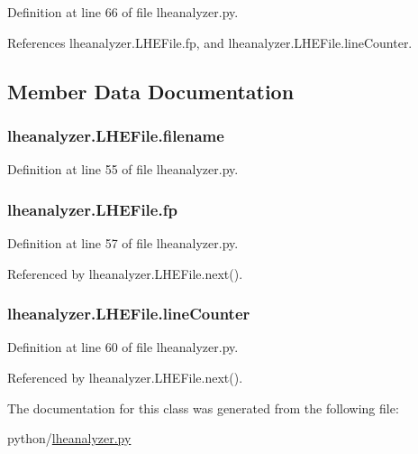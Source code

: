 Definition at line 66 of file lheanalyzer.\-py.



References lheanalyzer.\-L\-H\-E\-File.\-fp, and lheanalyzer.\-L\-H\-E\-File.\-line\-Counter.



\subsection{Member Data Documentation}
\subsubsection[{filename}]{\setlength{\rightskip}{0pt plus 5cm}lheanalyzer.\-L\-H\-E\-File.\-filename}\label{classlheanalyzer_1_1LHEFile_a4540497f01574a404af5e6c88b778444}


Definition at line 55 of file lheanalyzer.\-py.

\subsubsection[{fp}]{\setlength{\rightskip}{0pt plus 5cm}lheanalyzer.\-L\-H\-E\-File.\-fp}\label{classlheanalyzer_1_1LHEFile_a925cda8d013b284001623d05f895f364}


Definition at line 57 of file lheanalyzer.\-py.



Referenced by lheanalyzer.\-L\-H\-E\-File.\-next().

\subsubsection[{line\-Counter}]{\setlength{\rightskip}{0pt plus 5cm}lheanalyzer.\-L\-H\-E\-File.\-line\-Counter}\label{classlheanalyzer_1_1LHEFile_a829825c01eef6f78b107240b56730aad}


Definition at line 60 of file lheanalyzer.\-py.



Referenced by lheanalyzer.\-L\-H\-E\-File.\-next().



The documentation for this class was generated from the following file\-:\begin{DoxyCompactItemize}
\item 
python/\hyperlink{lheanalyzer_8py}{lheanalyzer.\-py}\end{DoxyCompactItemize}
